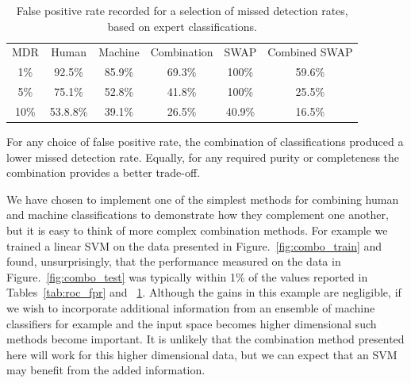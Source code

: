 \message{ !name(blank.tex)}\documentclass[a4paper,fleqn,usenatbib]{mnras}
\begin{document}
\begin{table}
\begin{minipage}{120mm}
\centering
\begin{tabular}{|c|c|c|c|c|c|}
MDR & Human & Machine & Combination & SWAP & Combined SWAP\\
1\% & 92.5\% & 85.9\% & 69.3\% & 100\% & 59.6\%\\
5\% & 75.1\% & 52.8\% & 41.8\% & 100\% & 25.5\%\\
10\% & 53.8.8\% & 39.1\% & 26.5\% & 40.9\% & 16.5\%\\
\end{tabular}
\caption{False positive rate recorded for a selection of missed detection rates, based on expert classifications.
}\label{tab:roc_mdr}
\end{minipage}
\end{table}

For any choice of false positive rate, the combination of classifications produced a lower missed detection rate. Equally, for any required purity or completeness the combination provides a better trade-off. 

We have chosen to implement one of the simplest methods for combining human and machine classifications to demonstrate how they complement one another, but it is easy to think of more complex combination methods. For example we trained a linear SVM on the data presented in Figure.~\ref{fig:combo_train} and found, unsurprisingly, that the performance measured on the data in Figure.~\ref{fig:combo_test} was typically within 1\% of the values reported in Tables~\ref{tab:roc_fpr} and ~\ref{tab:roc_mdr}.  Although the gains in this example are negligible, if we wish to incorporate additional information from an ensemble of machine classifiers for example and the input space becomes higher dimensional such methods become important.  It is unlikely that the combination method presented here will work for this higher dimensional data, but we can expect that an SVM may benefit from the added information.
\end{document}
